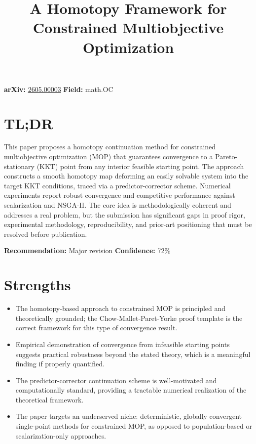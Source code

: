 \documentclass[11pt]{article}
\title{A Homotopy Framework for Constrained Multiobjective Optimization}
\date{}
\begin{document}
\maketitle

\noindent\textbf{arXiv:} \href{https://arxiv.org/abs/2605.00003}{2605.00003} \quad \textbf{Field:} math.OC\\

\section*{TL;DR}
This paper proposes a homotopy continuation method for constrained multiobjective optimization (MOP) that guarantees convergence to a Pareto-stationary (KKT) point from any interior feasible starting point. The approach constructs a smooth homotopy map deforming an easily solvable system into the target KKT conditions, traced via a predictor-corrector scheme. Numerical experiments report robust convergence and competitive performance against scalarization and NSGA-II. The core idea is methodologically coherent and addresses a real problem, but the submission has significant gaps in proof rigor, experimental methodology, reproducibility, and prior-art positioning that must be resolved before publication.

\textbf{Recommendation:} Major revision \quad \textbf{Confidence:} 72\%\\

\section*{Strengths}
\begin{itemize}[leftmargin=*]
  \item The homotopy-based approach to constrained MOP is principled and theoretically grounded; the Chow-Mallet-Paret-Yorke proof template is the correct framework for this type of convergence result.
  \item Empirical demonstration of convergence from infeasible starting points suggests practical robustness beyond the stated theory, which is a meaningful finding if properly quantified.
  \item The predictor-corrector continuation scheme is well-motivated and computationally standard, providing a tractable numerical realization of the theoretical framework.
  \item The paper targets an underserved niche: deterministic, globally convergent single-point methods for constrained MOP, as opposed to population-based or scalarization-only approaches.
\end{itemize}
\end{document}
